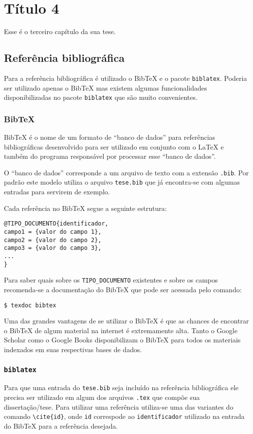 \chapter{Título 4}
Esse é o terceiro capítulo da sua tese.

\section{Referência bibliográfica}
Para a referência bibliográfica é utilizado o BibTeX e o pacote
\lstinline+biblatex+. Poderia ser utilizado apenas o BibTeX mas existem algumas
funcionalidades disponibilizadas no pacote \lstinline+biblatex+ que são muito
convenientes.

\subsection{BibTeX}
BibTeX é o nome de um formato de ``banco de dados'' para referências
bibliográficas desenvolvido para ser utilizado em conjunto com o LaTeX e também
do programa responsável por processar esse ``banco de dados''.

O ``banco de dados'' corresponde a um arquivo de texto com a extensão
\lstinline+.bib+. Por padrão este modelo utiliza o arquivo \lstinline+tese.bib+
que já encontra-se com algumas entradas para servirem de exemplo.

Cada referência no BibTeX segue a seguinte estrutura:
\begin{lstlisting}
@TIPO_DOCUMENTO{identificador,
campo1 = {valor do campo 1},
campo2 = {valor do campo 2},
campo3 = {valor do campo 3},
...
}
\end{lstlisting}

Para saber quais sobre os \lstinline+TIPO_DOCUMENTO+ existentes e sobre os
campos recomenda-se a documentação do BibTeX que pode ser acessada pelo comando:
\begin{lstlisting}
$ texdoc bibtex
\end{lstlisting}

Uma das grandes vantagens de se utilizar o BibTeX é que as chances de encontrar
o BibTeX de algum material na internet é extremamente alta. Tanto o Google
Scholar como o Google Books disponibilizam o BibTeX para todos os materiais
indexados em suas respectivas bases de dados.

\subsection{\lstinline+biblatex+}
Para que uma entrada do \lstinline+tese.bib+ seja incluído na referência
bibliográfica ele precisa ser utilizado em algum dos arquivos \lstinline+.tex+
que compõe sua dissertação/tese. Para utilizar uma referência utiliza-se uma das
variantes do comando \lstinline+\cite{id}+, onde
\lstinline+id+ correspode ao \lstinline+identificador+ utilizado na entrada do
BibTeX para a referência desejada.

